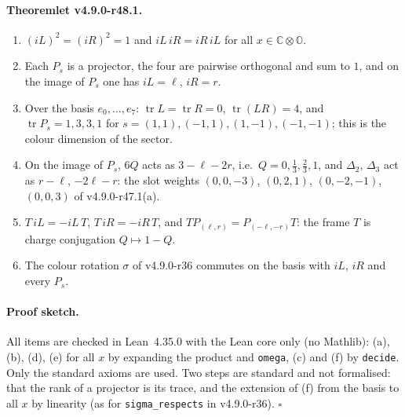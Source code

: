 \paragraph{Theoremlet v4.9.0-r48.1.}
\begin{enumerate}[leftmargin=2em]
\item[(a)] \((iL)^2=(iR)^2=1\) and \(iL\,iR=iR\,iL\) for all \(x\in\mathbb C\otimes\mathbb O\).
\item[(b)] Each \(P_s\) is a projector, the four are pairwise orthogonal and sum to \(1\), and on the image of \(P_s\) one has \(iL=\ell\),
\(iR=r\).
\item[(c)] Over the basis \(e_0,\dots,e_7\): \(\operatorname{tr}L=\operatorname{tr}R=0\), \(\operatorname{tr}(LR)=4\), and
\(\operatorname{tr}P_s=1,3,3,1\) for \(s=(1,1),(-1,1),(1,-1),(-1,-1)\); this is the colour dimension of the sector.
\item[(d)] On the image of \(P_s\), \(6Q\) acts as \(3-\ell-2r\), i.e.\ \(Q=0,\tfrac13,\tfrac23,1\), and \(\Delta_2\), \(\Delta_3\) act as
\(r-\ell\), \(-2\ell-r\): the slot weights \((0,0,-3)\), \((0,2,1)\), \((0,-2,-1)\), \((0,0,3)\) of v4.9.0-r47.1(a).
\item[(e)] \(T\,iL=-iL\,T\), \(T\,iR=-iR\,T\), and \(T P_{(\ell,r)}=P_{(-\ell,-r)}T\): the frame \(T\) is charge conjugation \(Q\mapsto1-Q\).
\item[(f)] The colour rotation \(\sigma\) of v4.9.0-r36 commutes on the basis with \(iL\), \(iR\) and every \(P_s\).
\end{enumerate}

\paragraph{Proof sketch.}
All items are checked in Lean~4.35.0 with the Lean core only (no Mathlib): (a), (b), (d), (e) for all \(x\) by expanding the product and
\texttt{omega}, (c) and (f) by \texttt{decide}.  Only the standard axioms are used.  Two steps are standard and not formalised: that the rank
of a projector is its trace, and the extension of (f) from the basis to all \(x\) by linearity (as for \texttt{sigma\_respects} in
v4.9.0-r36).  \(\square\)

